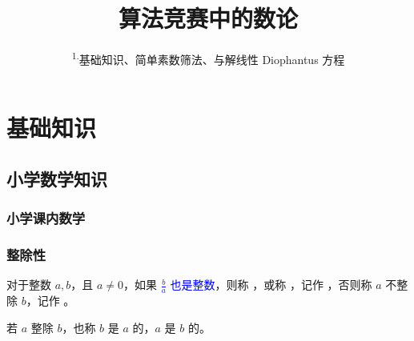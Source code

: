 \documentclass{../pkslide}
\title[算法竞赛中的数论（一）]{算法竞赛中的数论}
\subtitle{\texorpdfstring{\textsuperscript{1.}}{1. }基础知识、简单素数筛法、与解线性 Diophantus 方程}
\begin{document}
\section{基础知识}
\subsection{小学数学知识}
\subsubsection{小学课内数学}


\begin{frame}
  \frametitle{整除性}
  
  \begin{definition}[整除、因数与倍数]
    对于整数 $a, b$，且 $a \ne 0$，如果 \textcolor{blue}{$\frac{b}{a}$ 也是整数}，则称 ，或称 ，记作 ，否则称 $a$ 不整除 $b$，记作 。
   
    若 $a$ 整除 $b$，也称 $b$ 是 $a$ 的，$a$ 是 $b$ 的。
    
    \emptyline
    
  \end{definition}
\end{frame}
\end{document}
